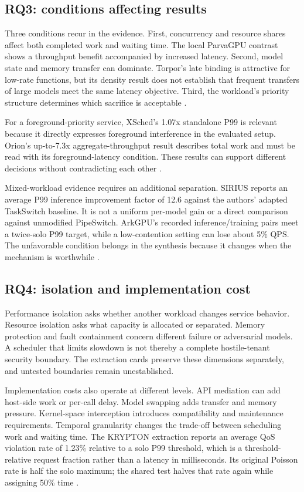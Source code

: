 \subsection{RQ3: conditions affecting results}
Three conditions recur in the evidence. First, concurrency and resource shares affect both completed work and waiting time. The local ParvaGPU contrast shows a throughput benefit accompanied by increased latency. Second, model state and memory transfer can dominate. Torpor's late binding is attractive for low-rate functions, but its density result does not establish that frequent transfers of large models meet the same latency objective. Third, the workload's priority structure determines which sacrifice is acceptable \cite{P011,P012}.

For a foreground-priority service, XSched's 1.07x standalone P99 is relevant because it directly expresses foreground interference in the evaluated setup. Orion's up-to-7.3x aggregate-throughput result describes total work and must be read with its foreground-latency condition. These results can support different decisions without contradicting each other \cite{P007,P015}.

Mixed-workload evidence requires an additional separation. SIRIUS reports an average P99 inference improvement factor of 12.6 against the authors' adapted TaskSwitch baseline. It is not a uniform per-model gain or a direct comparison against unmodified PipeSwitch. ArkGPU's recorded inference/training pairs meet a twice-solo P99 target, while a low-contention setting can lose about 5\% QPS. The unfavorable condition belongs in the synthesis because it changes when the mechanism is worthwhile \cite{P010,P019}.

\subsection{RQ4: isolation and implementation cost}
Performance isolation asks whether another workload changes service behavior. Resource isolation asks what capacity is allocated or separated. Memory protection and fault containment concern different failure or adversarial models. A scheduler that limits slowdown is not thereby a complete hostile-tenant security boundary. The extraction cards preserve these dimensions separately, and untested boundaries remain unestablished.

Implementation costs also operate at different levels. API mediation can add host-side work or per-call delay. Model swapping adds transfer and memory pressure. Kernel-space interception introduces compatibility and maintenance requirements. Temporal granularity changes the trade-off between scheduling work and waiting time. The KRYPTON extraction reports an average QoS violation rate of 1.23\% relative to a solo P99 threshold, which is a threshold-relative request fraction rather than a latency in milliseconds. Its original Poisson rate is half the solo maximum; the shared test halves that rate again while assigning 50\% time \cite{P014}.


